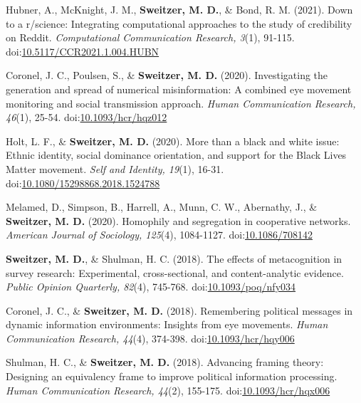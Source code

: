 \documentclass[letterpaper, 10pt]{extarticle}
\renewenvironment{itemize}{
  \begin{list}{}{
    \setlength{\leftmargin}{10pt}
  }
}{
  \end{list}
}
\begin{document}
\begin{itemize}
\item Hubner, A., McKnight, J. M., \textbf{Sweitzer, M. D.}, \& Bond, R. M. (2021). Down to a r/science: Integrating computational approaches to the study of credibility on Reddit. \textit{Computational Communication Research, 3}(1), 91-115. doi:\href{https://github.com/Matt-Sweitzer/Papers/blob/master/Hubneretal2021.pdf}{10.5117/CCR2021.1.004.HUBN}

\item Coronel, J. C., Poulsen, S., \& \textbf{Sweitzer, M. D.} (2020). Investigating the generation and spread of numerical misinformation: A combined eye movement monitoring and social transmission approach. \textit{Human Communication Research, 46}(1), 25-54. doi:\href{https://github.com/Matt-Sweitzer/Papers/blob/master/Coroneletal2020b.pdf}{10.1093/hcr/hqz012}

\item Holt, L. F., \& \textbf{Sweitzer, M. D.} (2020). More than a black and white issue: Ethnic identity, social dominance orientation, and support for the Black Lives Matter movement. \textit{Self and Identity, 19}(1), 16-31. doi:\href{https://github.com/Matt-Sweitzer/Papers/blob/master/HoltSweitzer2020.pdf}{10.1080/15298868.2018.1524788}

\item Melamed, D., Simpson, B., Harrell, A., Munn, C. W., Abernathy, J., \& \textbf{Sweitzer, M. D.} (2020). Homophily and segregation in cooperative networks. \textit{American Journal of Sociology, 125}(4), 1084-1127. doi:\href{https://github.com/Matt-Sweitzer/Papers/blob/master/Melamedetal2020.pdf}{10.1086/708142}

\item \textbf{Sweitzer, M. D.}, \& Shulman, H. C. (2018). The effects of metacognition in survey research: Experimental, cross-sectional, and content-analytic evidence. \textit{Public Opinion Quarterly, 82}(4), 745-768. doi:\href{https://github.com/Matt-Sweitzer/Papers/blob/master/SweitzerShulman2018.pdf}{10.1093/poq/nfy034}

\item Coronel, J. C., \& \textbf{Sweitzer, M. D.} (2018). Remembering political messages in dynamic information environments: Insights from eye movements. \textit{Human Communication Research, 44}(4), 374-398. doi:\href{https://github.com/Matt-Sweitzer/Papers/blob/master/CoronelSweitzer2018.pdf}{10.1093/hcr/hqy006}

\item \hangindent=20pt Shulman, H. C., \& \textbf{Sweitzer, M. D.} (2018). Advancing framing theory: Designing an equivalency frame to improve political information processing. \textit{Human Communication Research, 44}(2), 155-175. doi:\href{https://github.com/Matt-Sweitzer/Papers/blob/master/ShulmanSweitzer2018a.pdf}{10.1093/hcr/hqx006}


\end{itemize}
\end{document}
